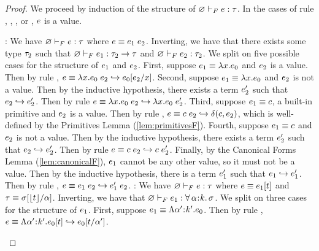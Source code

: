 \begin{proof} 
  We proceed by induction of the structure of 
  ${\varnothing} \vdash_F {e} : {\tau}$. In the cases of rule
  \fPrim, \fVar, \fAbs, or \fTAbs, $e$ is a value.
  \begin{itemize}
  \pfcase{\fApp}: We have 
  ${\varnothing} \vdash_F {e} : {\tau}$ where
  $\sexpr \equiv \app{\sexpr_1}{\sexpr_2}$. 
  Inverting, we have that there exists some type $\tau_2$
  such that ${\varnothing} \vdash_F {e_1} : {\tau_2 \rightarrow \tau}$
  and ${\varnothing} \vdash_F {e_2} : {\tau_2}$.
  We split on five possible cases for 
  the structure of $e_1$ and $e_2$. 
  First, suppose $e_1 \equiv \lambda x. {e_0}$ and $e_2$ is 
  a value. Then by rule \eAppAbs, 
  $e \equiv \app{\vabs{x}{\sexpr_0}}{\sexpr_2} \step \subst{\sexpr_0}{x}{\sexpr_2}$.
  Second, suppose $e_1 \equiv \lambda x. {e_0}$ and $e_2$
  is not a value. Then by the inductive hypothesis, there exists a term
  $e'_2$ such that $e_2 \hookrightarrow e'_2$. Then by rule \eAppV
  $e \equiv {\ensuremath{\lambda x. {e_0}}}\;{e_2} \hookrightarrow {\ensuremath{\lambda x. {e_0}}}\;{e'_2}$.
  Third, suppose $e_1 \equiv c$, a built-in primitive 
  and $e_2$ is a value. Then by rule \ePrim, 
  $e \equiv {\ensuremath{c}}\;{e_2} \hookrightarrow \delta(c,e_2)$,
  which is well-defined by the Primitives Lemma (\ref{lem:primitivesF}).
  Fourth, suppose $e_1 \equiv c$ and $e_2$
  is not a value. Then by the inductive hypothesis, there exists a term
  $e'_2$ such that $e_2 \hookrightarrow e'_2$. Then by rule \eAppV
  $e \equiv {\ensuremath{c}}\;{e_2} \hookrightarrow {\ensuremath{c}}\;{e'_2}$.
  Finally, by the Canonical Forms Lemma (\ref{lem:canonicalF}),
  $e_1$ cannot be any other
  value, so it must not be a value. Then by the inductive hypothesis,
  there is a term $e'_1$ such that $e_1 \hookrightarrow e'_1$. 
  Then by rule \eApp,
  $e \equiv \app{\sexpr_1}{\sexpr_2} \step \app{\sexpr'_1}{\sexpr_2}$.
  \pfcase{\fTApp}: We have 
  ${\varnothing} \vdash_F {e} : {\tau}$ where
  $e \equiv e_1[t]$ and
  $\tau \equiv {\sigma}[\lfloor{\ensuremath{t}}\rfloor/\alpha]$. 
  Inverting, we have that 
  ${\varnothing} \vdash_F {e_1} : {\forall\, \alpha\hspace{0.05em}{:}\hspace{0.05em} k.\, \sigma}$.
  We split on three cases for the structure of $e_1$.
  First, suppose $\sexpr_1 \equiv \tabs{\tvar'}{\skind'}{\sexpr_0}$.
  Then by rule \eTAppAbs, 
  $\sexpr \equiv \tyapp{\tabs{\tvar'}{\skind'}{\sexpr_0}}{\stype} 
  \step \subst{\sexpr_0}{\tvar'}{\stype}$.

\end{itemize}
\end{proof}
